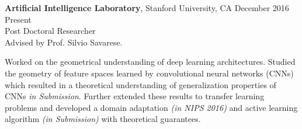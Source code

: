  \textbf{Artificial Intelligence Laboratory}, Stanford University, CA \hfill December 2016 \textendash ~ Present \vspace{0mm}\\\vspace{0mm}
 \hspace{-1mm}Post Doctoral Researcher  \hfill \vspace{1.5mm} \\
 Advised by Prof. Silvio Savarese.
 
 Worked on the geometrical understanding of deep learning architectures. Studied the geometry of feature spaces learned by convolutional neural networks (CNNs) which resulted in a theoretical understanding of generalization properties of CNNs \emph{in Submission}. Further extended these results to transfer learning problems and developed a domain adaptation \emph{(in NIPS 2016)} and active learning algorithm \emph{(in Submission)} with theoretical guarantees. 

